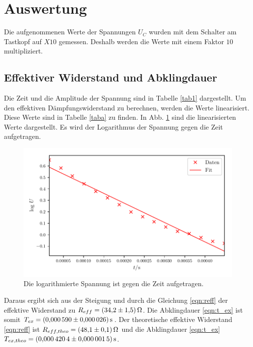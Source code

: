 \section{Auswertung}
\label{sec:Auswertung}

Die aufgenommenen Werte der Spannungen $U_{C}$ wurden mit dem Schalter am Tastkopf
auf $X10$ gemessen. Deshalb werden die Werte mit einem Faktor $10$ multipliziert.
\subsection{Effektiver Widerstand und Abklingdauer} 
Die Zeit und die Amplitude der Spannung sind in Tabelle
\ref{tab1} dargestellt. Um den effektiven Dämpfungswiderstand
zu berechnen, werden die Werte linearisiert. Diese Werte sind in
Tabelle \ref{taba} zu finden. In Abb. \ref{fig:plota}
sind die linearisierten Werte dargestellt. Es wird der
Logarithmus der Spannung gegen die Zeit aufgetragen.


\begin{figure}
  \centering
  \includegraphics{build/plota.pdf}
  \caption{Die logarithmierte Spannung ist gegen die Zeit aufgetragen.} %
  \label{fig:plota}
\end{figure}
\noindent Daraus ergibt sich aus der Steigung und durch die Gleichung \eqref{eqn:reff}
der effektive Widerstand zu $R_{eff} = \SI{34.2 \pm 1.5}{\ohm}$.
Die Abklingdauer \ref{eqn:t_ex} ist somit $T_{ex} = \SI{0.000590 \pm 0.000026}{\second}$.
\newline
Der theoretische effektive Widerstand \eqref{eqn:reff} ist $R_{eff,theo} = \SI{48.1 \pm 0.1}{\ohm}$ %
und die Abklingdauer \eqref{eqn:t_ex} $T_{ex,theo} = \SI{0.0004204 \pm 0.0000015}{\second}$.


